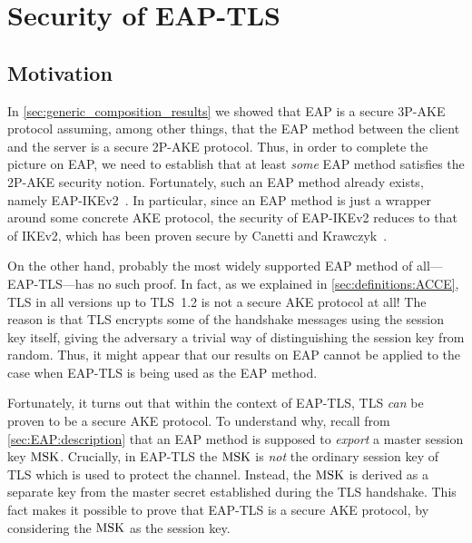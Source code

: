 \newcommand{\abort}{\operatorname{\mathsf{malicious-accept}}}
\newcommand{\CK}{\mathbf{CheckKey}}
\newcommand{\KOerror}{\mathsf{KOerror}}
\newcommand{\CKerror}{\mathsf{CKerror}}
\newcommand{\KDFcoll}{\operatorname{\mathit{ck}-\mathsf{coll}}}
\newcommand{\correct}{\mathsf{correctDec}}
\newcommand{\ncorrect}{\overline{\correct}}
\newcommand{\wrong}{\mathsf{wrongDec}}
\newcommand{\nwrong}{\overline{\wrong}}
\newcommand{\wrongMS}{\mathsf{wrongMS}}
\newcommand{\eventFresh}{\mathsf{fresh}}
\newcommand{\nfresh}{\operatorname{\mathsf{non-fresh}}}
\newcommand{\bwins}{\oracle.b = b'}
\newcommand{\KO}{\mathcal{KO}}


\chapter{Security of EAP-TLS}\label{sec:EAP-TLS-security}


\begingroup
\hypersetup{linkcolor=black}
\minitoc
\endgroup

\section{Motivation}\label{sec:EAP-TLS-security:intro}
In \cref{sec:generic_composition_results} we showed that EAP is a secure 3P-AKE protocol assuming, 
among other things,
that the EAP method between the client and the server is a secure 2P-AKE protocol.
Thus,
in order to complete the picture on EAP,
we need to establish that at least \emph{some} EAP method satisfies the 2P-AKE security notion. 
Fortunately,
such an EAP method already exists,
namely EAP-IKEv2~\cite{IETF:RFC5106:EAP-IKEv2}.
In particular,
since an EAP method is just a wrapper around some concrete AKE protocol,
the security of EAP-IKEv2 reduces to that of IKEv2, 
which has been proven secure by Canetti and Krawczyk~\cite{C:CanKra02}.

On the other hand,
probably the most widely supported EAP method of all---EAP-TLS---has no such proof.
In fact,
as we explained in \cref{sec:definitions:ACCE},
TLS in all versions up to TLS~1.2 is not a secure AKE protocol at all!
The reason is that TLS encrypts some of the handshake messages using the session key itself,
giving the adversary a trivial way of distinguishing the session key from random.
Thus,
it might appear that our results on EAP cannot be applied to the case when EAP-TLS is being used as the EAP method.

Fortunately,
it turns out that within the context of EAP-TLS,
TLS \emph{can} be proven to be a secure AKE protocol.
To understand why,
recall from \cref{sec:EAP:description} that an EAP method is supposed to \emph{export} a master session key $\mathrm{MSK}$.
Crucially,
in EAP-TLS the $\mathrm{MSK}$ is \emph{not} the ordinary session key of TLS which is used to protect the channel.
Instead,
the $\mathrm{MSK}$ is derived as a separate key from the master secret established during the TLS handshake.
This fact makes it possible to prove that EAP-TLS is a secure AKE protocol,
by considering the $\mathrm{MSK}$ as the session key.



